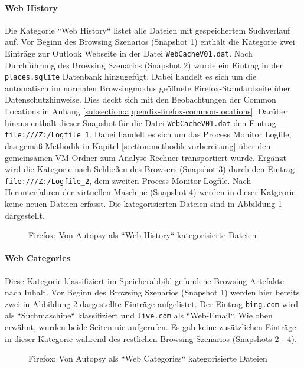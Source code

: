 \begin{appendices}
		\paragraph*{Web History}
		Die Kategorie ``Web History`` listet alle Dateien mit gespeichertem Suchverlauf auf. Vor Beginn des Browsing Szenarios (Snapshot 1) enthält die Kategorie zwei Einträge zur Outlook Webseite in der Datei \texttt{WebCacheV01.dat}. Nach Durchführung des Browsing Szenarios (Snapshot 2) wurde ein Eintrag in der \texttt{places.sqlite} Datenbank hinzugefügt. Dabei handelt es sich um die automatisch im normalen Browsingmodus geöffnete Firefox-Standardseite über Datenschutzhinweise. Dies deckt sich mit den Beobachtungen der Common Locations in Anhang \ref{subsection:appendix-firefox-common-locations}. Darüber hinaus enthält dieser Snapshot für die Datei \texttt{WebCacheV01.dat} den Eintrag \texttt{file:///Z:/Logfile\_1}. Dabei handelt es sich um das Process Monitor Logfile, das gemäß Methodik in Kapitel \ref{section:methodik-vorbereitung} über den gemeinsamen VM-Ordner zum Analyse-Rechner transportiert wurde. Ergänzt wird die Kategorie nach Schließen des Browsers (Snapshot 3) durch den Eintrag \texttt{file:///Z:/Logfile\_2}, dem zweiten Process Monitor Logfile. Nach Herunterfahren der virtuellen Maschine (Snapshot 4) werden in dieser Katgeorie keine neuen Dateien erfasst. Die kategorisierten Dateien sind in Abbildung \ref{img:firefox-web-history} dargestellt.
		\begin{figure}[h!]
			\centerline{}
			\caption{Firefox: Von Autopsy als ``Web History`` kategorisierte Dateien}
			\label{img:firefox-web-history}  
		\end{figure}
		
		\paragraph*{Web Categories}
		Diese Kategorie klassifiziert im Speicherabbild gefundene Browsing Artefakte nach Inhalt.
		Vor Beginn des Browsing Szenarios (Snapshot 1) werden hier bereits zwei in Abbildung \ref{img:firefox-web-categories} dargestellte Einträge aufgelistet. Der Eintrag \texttt{bing.com} wird als ``Suchmaschine`` klassifiziert und \texttt{live.com} als ``Web-Email``.
		Wie oben erwähnt, wurden beide Seiten nie aufgerufen. Es gab keine zusätzlichen Einträge in dieser Kategorie während des restlichen Browsing Szenarios (Snapshots 2 - 4).
		\begin{figure}[h!]
			\centerline{}
			\caption{Firefox: Von Autopsy als ``Web Categories`` kategorisierte Dateien}
			\label{img:firefox-web-categories}  
		\end{figure}
		

\end{appendices}

